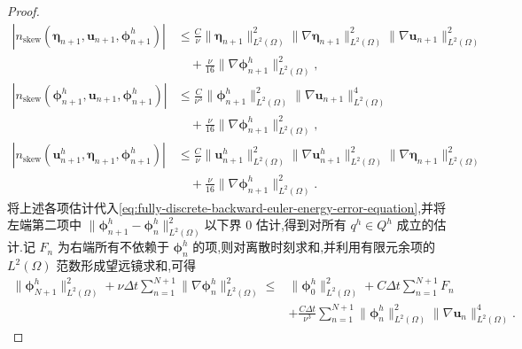 \begin{proof}
\[
\begin{aligned}
 |n_{\mathrm{skew}}(\symbf{\eta}_{n+1},\bm{u}_{n+1},
                         \symbf{\phi}_{n+1}^h)|
 &\le\frac C\nu
       \|\symbf{\eta}_{n+1}\|_{L^2(\Omega)}^2
       \|\nabla\symbf{\eta}_{n+1}\|_{L^2(\Omega)}^2
        \|\nabla\bm{u}_{n+1}\|_{L^2(\Omega)}^2\\
  &\quad+\frac\nu{16}\|\nabla\symbf{\phi}_{n+1}^h\|_{L^2(\Omega)}^2,\\
 |n_{\mathrm{skew}}(\symbf{\phi}_{n+1}^h,\bm{u}_{n+1},
                         \symbf{\phi}_{n+1}^h)|
 &\le\frac C{\nu^3}
       \|\symbf{\phi}_{n+1}^h\|_{L^2(\Omega)}^2
        \|\nabla\bm{u}_{n+1}\|_{L^2(\Omega)}^4\\
  &\quad+\frac\nu{16}\|\nabla\symbf{\phi}_{n+1}^h\|_{L^2(\Omega)}^2,\\
 |n_{\mathrm{skew}}(\bm{u}_{n+1}^h,\symbf{\eta}_{n+1},
                         \symbf{\phi}_{n+1}^h)|
 &\le\frac C\nu
       \|\bm{u}_{n+1}^h\|_{L^2(\Omega)}^2
       \|\nabla\bm{u}_{n+1}^h\|_{L^2(\Omega)}^2
        \|\nabla\symbf{\eta}_{n+1}\|_{L^2(\Omega)}^2\\
  &\quad+\frac\nu{16}\|\nabla\symbf{\phi}_{n+1}^h\|_{L^2(\Omega)}^2.
\end{aligned}
\]
将上述各项估计代入\cref{eq:fully-discrete-backward-euler-energy-error-equation},并将左端第二项中
$\|\symbf{\phi}_{n+1}^h-\symbf{\phi}_n^h\|_{L^2(\Omega)}^2$以下界 $0$ 估计,得到对所有 $q^h\in Q^h$ 成立的估计.记 $F_n$ 为右端所有不依赖于 $\symbf{\phi}_n^h$ 的项,则对离散时刻求和,并利用有限元余项的 $L^2(\Omega)$ 范数形成望远镜求和,可得
\begin{equation}\label{eq:fully-discrete-backward-euler-remainder-stability}
\begin{aligned}
 \|\symbf{\phi}_{N+1}^h\|_{L^2(\Omega)}^2
   +\nu\Delta t\sum_{n=1}^{N+1}
      \|\nabla\symbf{\phi}_n^h\|_{L^2(\Omega)}^2
  \le{}&\|\symbf{\phi}_0^h\|_{L^2(\Omega)}^2
       +C\Delta t\sum_{n=1}^{N+1}F_n\\
        &+\frac{C\Delta t}{\nu^3}
           \sum_{n=1}^{N+1}
              \|\symbf{\phi}_n^h\|_{L^2(\Omega)}^2
              \|\nabla\bm{u}_n\|_{L^2(\Omega)}^4.
\end{aligned}
\end{equation}


\end{proof}
